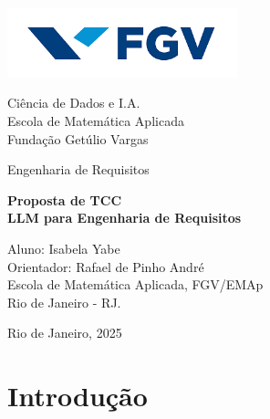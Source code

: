 \documentclass[12pt,a4paper]{article}
\begin{document}
\begin{titlepage}
    \begin{center}
        \vspace*{0cm}
        
            \includegraphics[width=0.5\textwidth]{Images/Logo_FGV.png} 
            
        \vspace{1.5cm}
        \large
        
        Ciência de Dados e I.A.\\
        Escola de Matemática Aplicada\\
        Fundação Getúlio Vargas\\

        \vspace{1cm}  
    
        \Large
        Engenharia de Requisitos
            
        \vspace{2cm}
        
        \vspace{0.25cm}

        \Huge \textbf{Proposta de TCC} \\ 
        \vspace{0.5cm}
        \huge \textbf{LLM para Engenharia de Requisitos}
        \vspace{3.6cm}
        
        \large
                Aluno: Isabela Yabe\\
                Orientador: Rafael de Pinho André\\
                Escola de Matemática Aplicada, FGV/EMAp \\
                Rio de Janeiro - RJ.
        \vfill
            
        \vspace{0.8cm}  
        
        Rio de Janeiro, 2025
            
    \end{center}
\end{titlepage}

\newpage
\tableofcontents

\newpage
\section{Introdução}
\end{document}

